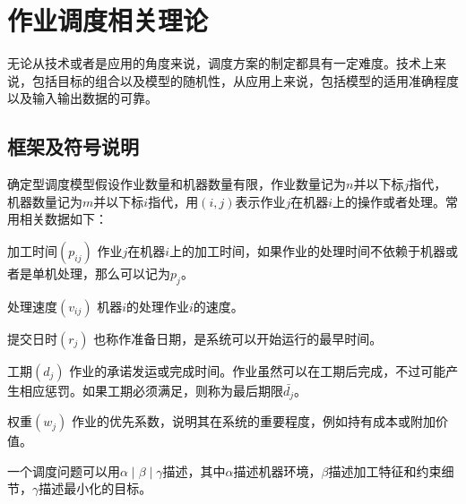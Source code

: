 \chapter{作业调度相关理论}
无论从技术或者是应用的角度来说，调度方案的制定都具有一定难度。技术上来说，包括目标的组合以及模型的随机性，从应用上来说，包括模型的适用准确程度以及输入输出数据的可靠\cite{pinedo}。

\section{框架及符号说明}
确定型调度模型假设作业数量和机器数量有限，作业数量记为$n$并以下标$j$指代，机器数量记为$m$并以下标$i$指代，用$(i,j)$表示作业$j$在机器$i$上的操作或者处理。常用相关数据如下：
\renewcommand{\descriptionlabel}[1]{\heiti{#1}}
\begin{compactdesc}
\item[加工时间$(p_{ij})$]作业$j$在机器$i$上的加工时间，如果作业的处理时间不依赖于机器或者是单机处理，那么可以记为$p_j$。
\item[处理速度$(v_{ij})$]机器$i$的处理作业$i$的速度。
\item[提交日时$(r_j)$]也称作准备日期，是系统可以开始运行的最早时间。
\item[工期$(d_j)$]作业的承诺发运或完成时间。作业虽然可以在工期后完成，不过可能产生相应惩罚。如果工期必须满足，则称为最后期限$\bar{d_j}$。
\item[权重$(w_j)$]作业的优先系数，说明其在系统的重要程度，例如持有成本或附加价值。
\end{compactdesc}

一个调度问题可以用$\alpha\mid\beta\mid\gamma$描述，其中$\alpha$描述机器环境，$\beta$描述加工特征和约束细节，$\gamma$描述最小化的目标。

